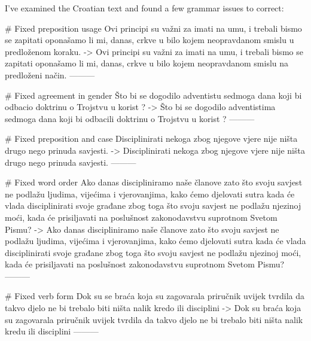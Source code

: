 I've examined the Croatian text and found a few grammar issues to correct:

# Fixed preposition usage
Ovi principi su važni za imati na umu, i trebali bismo se zapitati oponašamo li mi, danas, crkve u bilo kojem neopravdanom smislu u predloženom koraku.
->
Ovi principi su važni za imati na umu, i trebali bismo se zapitati oponašamo li mi, danas, crkve u bilo kojem neopravdanom smislu na predloženi način.
---------

# Fixed agreement in gender
Što bi se dogodilo adventistu sedmoga dana koji bi odbacio doktrinu o Trojstvu u korist ?
->
Što bi se dogodilo adventistima sedmoga dana koji bi odbacili doktrinu o Trojstvu u korist ?
---------

# Fixed preposition and case
Disciplinirati nekoga zbog njegove vjere nije ništa drugo nego prinuda savjesti.
->
Disciplinirati nekoga zbog njegove vjere nije ništa drugo nego prinuda savjesti.
---------

# Fixed word order
Ako danas discipliniramo naše članove zato što svoju savjest ne podlažu ljudima, vijećima i vjerovanjima, kako ćemo djelovati sutra kada će vlada disciplinirati svoje građane zbog toga što svoju savjest ne podlažu njezinoj moći, kada će prisiljavati na poslušnost zakonodavstvu suprotnom Svetom Pismu?
->
Ako danas discipliniramo naše članove zato što svoju savjest ne podlažu ljudima, vijećima i vjerovanjima, kako ćemo djelovati sutra kada će vlada disciplinirati svoje građane zbog toga što svoju savjest ne podlažu njezinoj moći, kada će prisiljavati na poslušnost zakonodavstvu suprotnom Svetom Pismu?
---------

# Fixed verb form
Dok su se braća koja su zagovarala priručnik uvijek tvrdila da takvo djelo ne bi trebalo biti ništa nalik kredo ili disciplini
->
Dok su braća koja su zagovarala priručnik uvijek tvrdila da takvo djelo ne bi trebalo biti ništa nalik kredu ili disciplini
---------